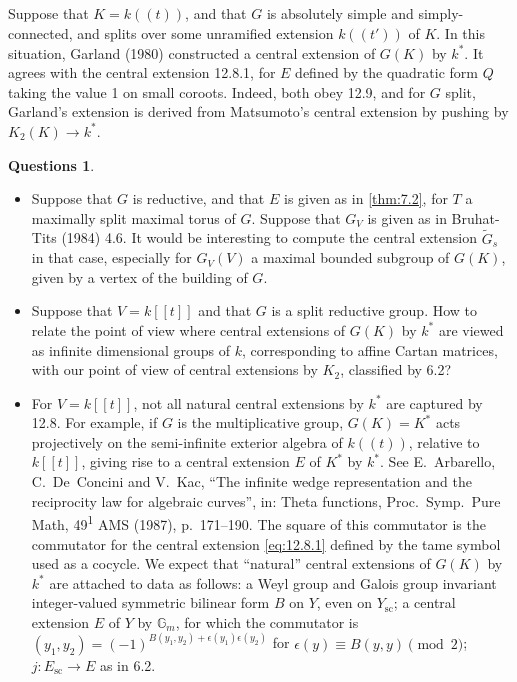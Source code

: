 \documentclass[11pt,a4paper]{article}
\theoremstyle{plain}
\theoremstyle{definition}
\newtheorem{questions}[theorem]{Questions}
\newcommand{\Gm}{{\mathbb{G}_m}}
\newcommand{\scu}{\mathrm{sc}}
\begin{document}
\subsection{}
Suppose that $K = k((t))$, and that $G$ is absolutely simple and simply-connected, and splits over some unramified extension $k((t'))$ of $K$. In this situation, Garland (1980) constructed a central extension of $G(K)$ by $k^*$. It agrees with the central extension 12.8.1, for $E$ defined by the quadratic form $Q$ taking the value 1 on small coroots. Indeed, both obey 12.9, and for $G$ split, Garland's extension is derived from Matsumoto's central extension by pushing by $K_2(K) \to k^*$.

\begin{questions}\label{ques:12.13}
\begin{itemize}
\item[(i)] Suppose that $G$ is reductive, and that $E$ is given as in \ref{thm:7.2}, for $T$ a maximally split maximal torus of $G$. Suppose that $G_V$ is given as in Bruhat-Tits (1984) 4.6. It would be interesting to compute the central extension $\widetilde{G}_s$ in that case, especially for $G_V(V)$ a maximal bounded subgroup of $G(K)$, given by a vertex of the building of $G$.
\item[(ii)] Suppose that $V = k[[t]]$ and that $G$ is a split reductive group. How to relate the point of view where central extensions of $G(K)$ by $k^*$ are viewed as infinite dimensional groups of $k$, corresponding to affine Cartan matrices, with our point of view of central extensions by $K_2$, classified by 6.2?
\item[(iii)] For $V = k[[t]]$, not all natural central extensions by $k^*$ are captured by 12.8. For example, if $G$ is the multiplicative group, $G(K) = K^*$ acts projectively on the semi-infinite exterior algebra of $k((t))$, relative to $k[[t]]$, giving rise to a central extension $E$ of $K^*$ by $k^*$. See E.~Arbarello, C.~De~Concini and V.~Kac, ``The infinite wedge representation and the reciprocity law for algebraic curves'', in: Theta functions, Proc.~Symp.~Pure Math, 49\textsuperscript{1} AMS (1987), p.~171--190. The square of this commutator is the commutator for the central extension \eqref{eq:12.8.1} defined by the tame symbol used as a cocycle. We expect that ``natural'' central extensions of $G(K)$ by $k^*$ are attached to data as follows: a Weyl group and Galois group invariant integer-valued symmetric bilinear form $B$ on $Y$, even on $Y_\scu$; a central extension $E$ of $Y$ by $\Gm$, for which the commutator is $(y_1, y_2) = (-1)^{B(y_1, y_2) + \epsilon(y_1)\epsilon(y_2)}$ for $\epsilon(y) \equiv B(y,y) \pmod 2$; $j: E_\scu \to E$ as in 6.2.
\end{itemize}
\end{questions}
\end{document}
